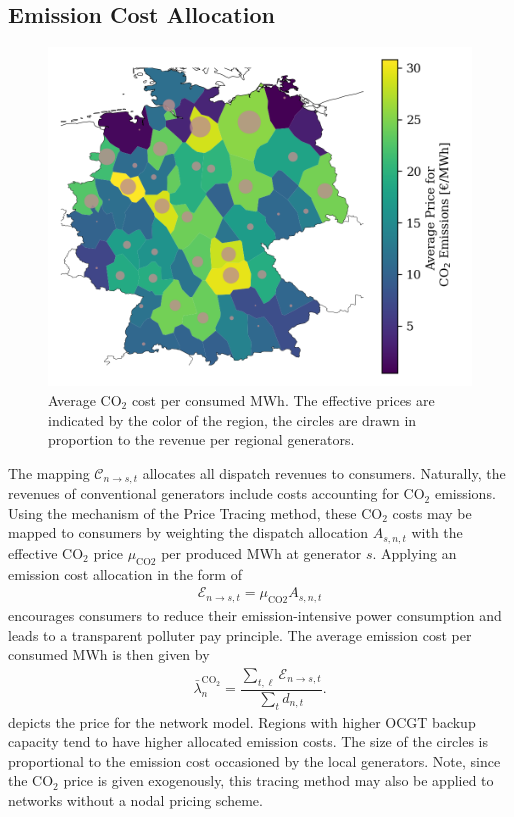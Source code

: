 \documentclass[11pt,twocolumn]{article}
\newcommand{\averagelmp}[1][n]{\bar{\lambda}_{#1}}
\newcommand{\demand}[1][n]{d_{#1,t}}
\newcommand{\emissionprice}{\mu_{\text{CO2}}}
\newcommand{\cost}{\mathcal{C}}
\newcommand{\emissioncost}{\mathcal{E}}
\newcommand{\allocategeneration}[1][s, n]{A_{#1,t}}
\newcommand{\allocategeneratorcost}[1][n \rightarrow s]{\cost_{#1, t}}
\newcommand{\allocateemissioncost}[1][n \rightarrow s]{\emissioncost_{#1,t}}
\begin{document}
\subsection{Emission Cost Allocation}
\label{sec:co2-cost-allocation}

\begin{figure}[h!]
    \includegraphics[width=\linewidth]{de50/maps_price/co2_cost.png}
    \caption{Average CO$_2$ cost per consumed MWh. The effective prices are indicated by the color of the region, the circles are drawn in proportion to the revenue per regional generators.}
    \label{fig:opex_price}
\end{figure}

The mapping $\allocategeneratorcost$ allocates all dispatch revenues to consumers. Naturally, the revenues of conventional generators include costs accounting for CO$_2$ emissions. Using the mechanism of the Price Tracing method, these CO$_2$ costs may be mapped to consumers by weighting the dispatch allocation $\allocategeneration$ with the effective CO$_2$ price $\emissionprice$ per produced MWh at generator $s$. Applying an emission cost allocation in the form of     
\begin{align}
    \allocateemissioncost = \emissionprice \allocategeneration
\end{align}       
encourages consumers to reduce their emission-intensive power consumption and leads to a transparent polluter pay principle. The average emission cost per consumed MWh is then given by 
\begin{align}
    \averagelmp^{\text{CO}_2} = \dfrac{\sum_{t,\ell} \allocateemissioncost}{\sum_t \demand}.
\end{align} 
 depicts the price for the network model. Regions with higher \ac{OCGT} backup capacity tend to have higher allocated emission costs. The size of the circles is proportional to the emission cost occasioned by the local generators.   
Note, since the CO$_2$ price is given exogenously, this tracing method may also be applied to networks without a nodal pricing scheme.  
\end{document}
